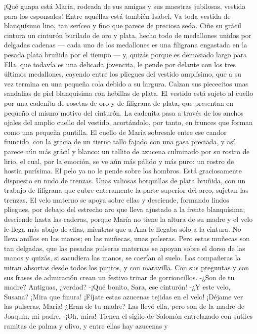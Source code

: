 \documentclass[12pt]{book} %
\begin{document}
¡Qué guapa está María, rodeada de sus amigas y sus maestras jubilosas, vestida para los esponsales! Entre aquéllas está 
también Isabel. 
Va toda vestida de blanquísimo lino, tan seríceo y fino que parece de preciosa seda. Ciñe su grácil cintura un cinturón burilado de oro y plata, hecho todo de medallones unidos por delgadas cadenas — cada uno de los medallones es una filigrana engastada en la pesada plata bruñida por el tiempo — y, quizás porque es demasiado largo para Ella, que todavía es una delicada jovencita, le pende por delante con los tres últimos medallones, cayendo entre los pliegues del vestido amplísimo, que a su vez termina en una pequeña cola debido a su largura. Calzan sus piececitos unas sandalias de piel blanquísima con hebillas de plata. 
El vestido está sujeto al cuello por una cadenita de rosetas de oro y de filigrana de plata, que presentan en pequeño el 
mismo motivo del cinturón. La cadenita pasa a través de los anchos ojales del amplio cuello del vestido, acortándolo, por tanto, en frunces que forman como una pequeña puntilla. El cuello de María sobresale entre ese candor fruncido, con la gracia de un tierno tallo fajado con una gasa preciada, y así parece aún más grácil y blanco: un tallito de azucena culminado por su rostro de lirio, el cual, por la emoción, se ve aún más pálido y más puro: un rostro de hostia purísima. 
El pelo ya no le pende sobre los hombros. Está graciosamente dispuesto en nudo de trenzas. Unas valiosas horquillas de 
plata bruñida, con un trabajo de filigrana que cubre enteramente la parte superior del arco, sujetan las trenzas. El velo materno se apoya sobre ellas y desciende, formando lindos pliegues, por debajo del estrecho aro que lleva ajustado a la frente blanquísima; desciende hasta las caderas, porque María no tiene la altura de su madre y el velo le llega más abajo de ellas, mientras que a Ana le llegaba sólo a la cintura. 
No lleva anillos en las manos; en las muñecas, unas pulseras. Pero estas muñecas son tan delgadas, que las pesadas 
pulseras maternas se apoyan sobre el dorso de las manos y quizás, si sacudiera las manos, se caerían al suelo. 
Las compañeras la miran absortas desde todos los puntos, y con maravilla. Con sus preguntas y con sus frases de 
admiración crean un festivo trinar de gorrioncillos. 
-¿Son de tu madre? 
Antiguas, ¿verdad? 
-¡Qué bonito, Sara, ese cinturón! 
-¿Y este velo, Susana? ¡Mira que finura! ¡Fíjate estas azucenas tejidas en el velo! 
¡Déjame ver las pulseras, María! ¿Eran de tu madre? 
Las llevó ella, pero son de la madre de Joaquín, mi padre. 
-¡Oh, mira! Tienen el sigilo de Salomón entrelazado con sutiles ramitas de palma y olivo, y entre ellas hay azucenas y 
\end{document}
